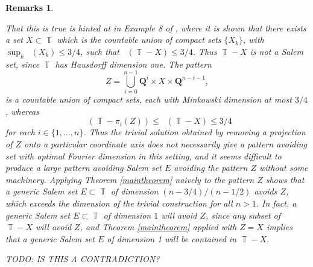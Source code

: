 \documentclass[dvipsnames,letterpaper,12pt]{article}
\numberwithin{equation}{section}
\DeclareMathOperator{\minkdim}{\dim_{\mathbb{M}}}
\DeclareMathOperator{\fordim}{\dim_{\mathbb{F}}}
\DeclareMathOperator{\TT}{\mathbb{T}}
\newtheorem{remarks}[theorem]{Remarks}
\numberwithin{theorem}{section}
\begin{document}
\begin{remarks}
\begin{enumerate}
        That this is true is hinted at in Example 8 of \cite{Ekstrom2014}, where it is shown that there exists a set $X \subset \TT$ which is the countable union of compact sets $\{ X_k \}$, with $\sup_k \minkdim(X_k) \leq 3/4$, such that $\fordim(\TT - X) \leq 3/4$. Thus $\TT - X$ is not a Salem set, since $\TT$ has Hausdorff dimension one. The pattern
        \[ Z = \bigcup_{i = 0}^{n-1} \mathbf{Q}^i \times X \times \mathbf{Q}^{n-i-1}, \]
        is a countable union of compact sets, each with Minkowski dimension at most $3/4$, whereas
        \[ \fordim(\TT - \pi_i(Z)) \leq \fordim(\TT - X) \leq 3/4 \]
        for each $i \in \{ 1, \dots, n \}$. Thus the trivial solution obtained by removing a projection of $Z$ onto a particular coordinate axis does not necessarily give a pattern avoiding set with optimal Fourier dimension in this setting, and it seems difficult to produce a large pattern avoiding Salem set $E$ avoiding the pattern $Z$ without some machinery. Applying Theorem \ref{maintheorem} naively to the pattern $Z$ shows that a generic Salem set $E \subset \TT$ of dimension $(n-3/4)/(n-1/2)$ avoids $Z$, which exceeds the dimension of the trivial construction for all $n > 1$. In fact, a generic Salem set $E \subset \TT$ of dimension $1$ will avoid $Z$, since any subset of $\TT - X$ will avoid $Z$, and Theorem \ref{maintheorem} applied with $Z = X$ implies that a generic Salem set $E$ of dimension 1 will be contained in $\TT - X$.

        TODO: IS THIS A CONTRADICTION?






\end{enumerate}
\end{remarks}
\end{document}
